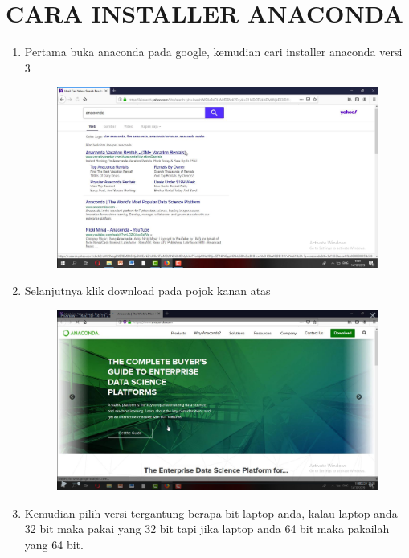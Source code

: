\section*{CARA INSTALLER ANACONDA} 
\begin{enumerate}
\item Pertama buka anaconda pada google, kemudian cari installer anaconda versi 3
    \begin{figure}[h]
    \centering
    \includegraphics[scale=0.2]{gambar/1.png}
    \caption{}
    \label{fig:my_label}
\end{figure}
\item 	Selanjutnya klik download pada pojok kanan atas
\begin{figure}[h]
    \centering
    \includegraphics[scale=0.2]{gambar/2.png}
    \caption{}
    \label{fig:my_label}
\end{figure}
\item 	Kemudian pilih versi tergantung berapa bit laptop anda, kalau laptop anda 32 bit maka pakai yang 32 bit tapi jika laptop anda 64 bit maka pakailah yang 64 bit.
\begin{figure}[h]

\end{figure}
\end{enumerate}
